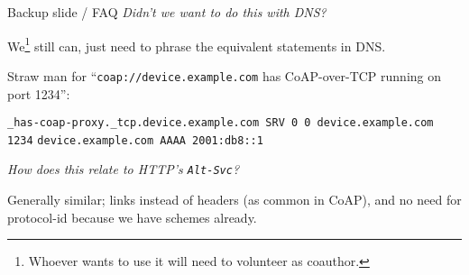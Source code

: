 \documentclass[aspectratio=169]{beamer}
\begin{document}
\begin{frame}{Backup slide / FAQ}
	\setlength{\parskip}{0.5em}
	\textit{Didn't we want to do this with DNS?}

	We\footnote{Whoever wants to use it will need to volunteer as coauthor.} still can, just need to phrase the equivalent statements in DNS.

	Straw man for ``\texttt{coap://device.example.com} has CoAP-over-TCP running on port 1234'':

	\texttt{\_has-coap-proxy.\_tcp.device.example.com SRV 0 0 device.example.com 1234}
	\texttt{device.example.com AAAA 2001:db8::1}

	\bigskip

	\textit{How does this relate to HTTP's \texttt{Alt-Svc}?}

	Generally similar; links instead of headers (as common in CoAP), and no need for protocol-id because we have schemes already.
\end{frame}
\end{document}
